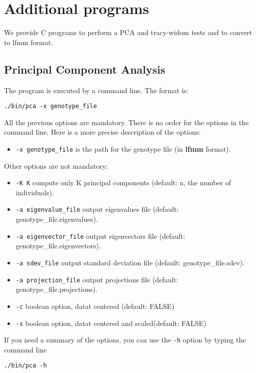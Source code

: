 \documentclass[10pt,a4paper]{article}
\begin{document}
\section{Additional programs}

We provide C programs to perform a PCA and tracy-widom tests and to convert to lfmm format.

\subsection{Principal Component Analysis}

The program is executed by a command line. The format is:
\begin{Verbatim}[frame=single]
./bin/pca -x genotype_file 
\end{Verbatim}

\noindent
All the previous options are mandatory. There is no order for the options in the command line.
Here is a more precise description of the options:
\begin{itemize}
\item \verb|-x genotype_file| is the path for the genotype file (in {\bf lfmm} format).
\end{itemize}

\noindent
Other options are not mandatory:
\begin{itemize}
\item \verb|-K K| compute only K principal components (default: n, the number of individuals). 
\item \verb|-a eigenvalue_file| output eigenvalues file (default: genotype\_file.eigenvalues). 
\item \verb|-a eigenvector_file| output eigenvectors file (default: genotype\_file.eigenvectors). 
\item \verb|-a sdev_file| output standard deviation file (default: genotype\_file.sdev). 
\item \verb|-a projection_file| output projections file (default: genotype\_file.projections). 
\item \verb|-c| boolean option, datat centered (default: FALSE)
\item \verb|-s| boolean option, datat centered and scaled(default: FALSE)
\end{itemize}

\noindent
If you need a summary of the options, you can use the \verb|-h| option by typing the command line
\begin{Verbatim}[frame=single]
./bin/pca -h
\end{Verbatim}
\end{document}
